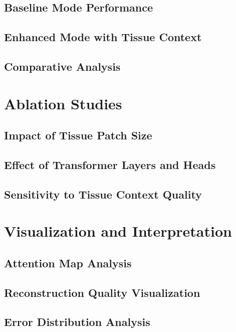 \subsection{Baseline Mode Performance}

\subsection{Enhanced Mode with Tissue Context}

\subsection{Comparative Analysis}

\section{Ablation Studies}

\subsection{Impact of Tissue Patch Size}

\subsection{Effect of Transformer Layers and Heads}

\subsection{Sensitivity to Tissue Context Quality}

\section{Visualization and Interpretation}

\subsection{Attention Map Analysis}

\subsection{Reconstruction Quality Visualization}

\subsection{Error Distribution Analysis}

